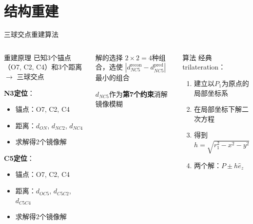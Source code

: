 \documentclass[aspectratio=169,9pt]{beamer}
\begin{document}
\section{结构重建}

\begin{frame}{三球交点重建算法}
  \begin{columns}[T]
    \begin{block}{重建原理}
      \scriptsize
      已知3个锚点（O7, C2, C4）和3个距离 $\to$ 三球交点

      \textbf{N3定位}：
      \begin{itemize}
        \item 锚点：O7, C2, C4
        \item 距离：$d_{ON}$, $d_{NC2}$, $d_{NC4}$
        \item 求解得2个镜像解
      \end{itemize}

      \textbf{C5定位}：
      \begin{itemize}
        \item 锚点：O7, C2, C4
        \item 距离：$d_{OC5}$, $d_{C5C2}$, $d_{C5C4}$
        \item 求解得2个镜像解
      \end{itemize}
    \end{block}

    \begin{block}{解的选择}
      \scriptsize
      $2 \times 2 = 4$种组合，选使
      $|d_{NC5}^{\text{recon}} - d_{NC5}^{\text{pred}}|$ 最小的组合

      $d_{NC5}$作为\textbf{第7个约束}消解镜像模糊
    \end{block}

    \begin{block}{算法}
      \scriptsize
      经典trilateration：
      \begin{enumerate}
        \item 建立以$P_1$为原点的局部坐标系
        \item 在局部坐标下解二次方程
        \item 得到 $h = \sqrt{r_1^2 - x^2 - y^2}$
        \item 两个解：$P \pm h\hat{e}_z$
      \end{enumerate}
    \end{block}


\end{columns}
\end{frame}
\end{document}
